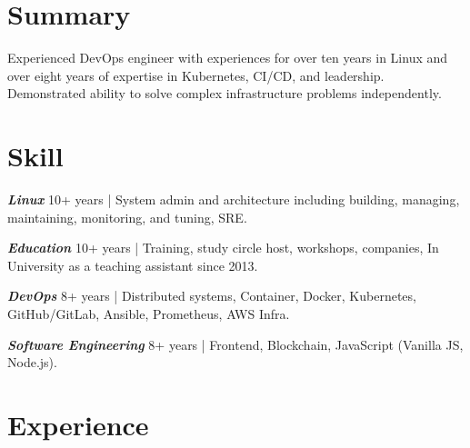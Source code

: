 \documentclass[]{deedy-resume-openfont}
\begin{document}
\begin{minipage}[t]{1\textwidth}



\section{Summary}
\begin{summary}
    Experienced DevOps engineer with experiences for over ten years in Linux and over eight years of expertise in Kubernetes, CI/CD, and leadership. Demonstrated ability to solve complex infrastructure problems independently.
\end{summary}

\section{Skill}
\vspace{\topsep}
\begin{tightemize}
    \item \textbf{\emph{Linux}} 10+ years | System admin and architecture including building, managing, maintaining, monitoring, and tuning, SRE.
    \item \textbf{\emph{Education}} 10+ years | Training, study circle host, workshops, companies, In University as a teaching assistant since 2013.
    \item \textbf{\emph{DevOps}} 8+ years | Distributed systems, Container, Docker, Kubernetes, GitHub/GitLab, Ansible, Prometheus, AWS Infra.
    \item \textbf{\emph{Software Engineering}}  8+ years | Frontend, Blockchain, JavaScript (Vanilla JS, Node.js).
\end{tightemize}


\section{Experience}


\end{minipage}
\end{document}
